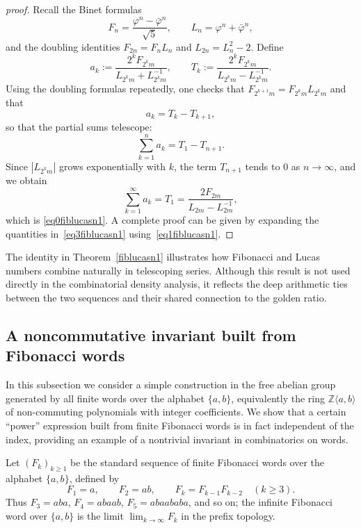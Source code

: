 \documentclass[12pt, a4paper]{article}
\begin{document}
\begin{proof}[proof]
Recall the Binet formulas
\begin{equation}\label{eq1fiblucasn1}
F_n = \frac{\varphi^n - \bar{\varphi}^n}{\sqrt{5}}, 
\qquad 
L_n = \varphi^n + \bar{\varphi}^n,
\end{equation}
and the doubling identities $F_{2n} = F_n L_n$ and $L_{2n} = L_n^2 - 2$. Define
\begin{equation}\label{eq3fiblucasn1}
a_k := \frac{2^k F_{2^k m}}{L_{2^k m} + L_{2^k m}^{-1}},
\qquad
T_k := \frac{2^k F_{2^k m}}{L_{2^k m} - L_{2^k m}^{-1}}.
\end{equation}
Using the doubling formulas repeatedly, one checks that $F_{2^{k+1}m} = F_{2^k m} L_{2^k m}$ and that
\[
a_k = T_k - T_{k+1},
\]
so that the partial sums telescope:
\begin{equation}\label{eq5fiblucasn1}
\sum_{k=1}^n a_k = T_1 - T_{n+1}.
\end{equation}
Since $|L_{2^k m}|$ grows exponentially with $k$, the term $T_{n+1}$ tends to $0$ as $n \to \infty$, and we obtain
\[
\sum_{k=1}^{\infty} a_k = T_1 = \frac{2 F_{2m}}{L_{2m} - L_{2m}^{-1}},
\]
which is \eqref{eq0fiblucasn1}. A complete proof can be given by expanding the quantities in~\eqref{eq3fiblucasn1} using~\eqref{eq1fiblucasn1}.
\end{proof}

The identity in Theorem~\ref{fiblucasn1} illustrates how Fibonacci and Lucas numbers combine naturally in telescoping series. Although this result is not used directly in the combinatorial density analysis, it reflects the deep arithmetic ties between the two sequences and their shared connection to the golden ratio.
\subsection{A noncommutative invariant built from Fibonacci words}

In this subsection we consider a simple construction in the free abelian group generated by all finite words over the alphabet $\{a,b\}$, equivalently the ring $\mathbb{Z}\langle a,b \rangle$ of non-commuting polynomials with integer coefficients. We show that a certain ``power'' expression built from finite Fibonacci words is in fact independent of the index, providing an example of a nontrivial invariant in combinatorics on words.

Let $(F_k)_{k \ge 1}$ be the standard sequence of finite Fibonacci words over the alphabet $\{a,b\}$, defined by
\[
F_1 = a,\qquad F_2 = ab,\qquad F_k = F_{k-1}F_{k-2} \quad (k \ge 3).
\]
Thus $F_3 = aba$, $F_4 = abaab$, $F_5 = abaababa$, and so on; the infinite Fibonacci word over $\{a,b\}$ is the limit $\lim_{k\to\infty} F_k$ in the prefix topology.
\end{document}
